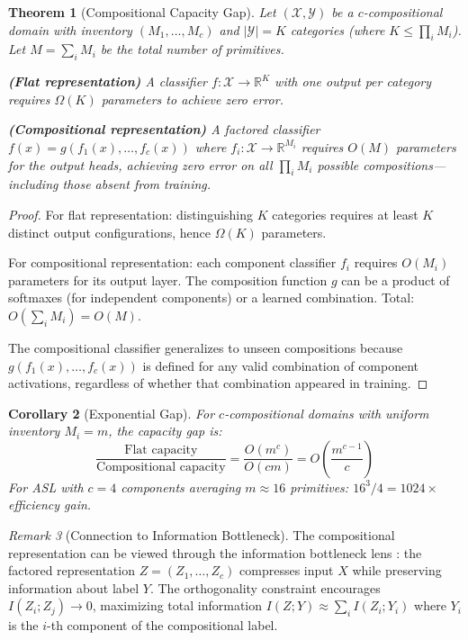 \documentclass{article}
\newtheorem{theorem}{Theorem}[section]
\newtheorem{corollary}[theorem]{Corollary}
\theoremstyle{definition}
\theoremstyle{remark}
\newtheorem{remark}[theorem]{Remark}
\begin{document}
\begin{theorem}[Compositional Capacity Gap]
\label{thm:capacity_gap}
Let $(\mathcal{X}, \mathcal{Y})$ be a $c$-compositional domain with inventory $(M_1, \ldots, M_c)$ and $|\mathcal{Y}| = K$ categories (where $K \leq \prod_i M_i$). Let $M = \sum_i M_i$ be the total number of primitives.

\textbf{(Flat representation)} A classifier $f: \mathcal{X} \to \mathbb{R}^{K}$ with one output per category requires $\Omega(K)$ parameters to achieve zero error.

\textbf{(Compositional representation)} A factored classifier $f(x) = g(f_1(x), \ldots, f_c(x))$ where $f_i: \mathcal{X} \to \mathbb{R}^{M_i}$ requires $O(M)$ parameters for the output heads, achieving zero error on all $\prod_i M_i$ possible compositions---including those absent from training.
\end{theorem}

\begin{proof}
For flat representation: distinguishing $K$ categories requires at least $K$ distinct output configurations, hence $\Omega(K)$ parameters.

For compositional representation: each component classifier $f_i$ requires $O(M_i)$ parameters for its output layer. The composition function $g$ can be a product of softmaxes (for independent components) or a learned combination. Total: $O(\sum_i M_i) = O(M)$.

The compositional classifier generalizes to unseen compositions because $g(f_1(x), \ldots, f_c(x))$ is defined for any valid combination of component activations, regardless of whether that combination appeared in training.
\end{proof}

\begin{corollary}[Exponential Gap]
For $c$-compositional domains with uniform inventory $M_i = m$, the capacity gap is:
\begin{equation}
\frac{\text{Flat capacity}}{\text{Compositional capacity}} = \frac{O(m^c)}{O(cm)} = O\left(\frac{m^{c-1}}{c}\right)
\end{equation}
For ASL with $c=4$ components averaging $m \approx 16$ primitives: $16^3/4 = 1024\times$ efficiency gain.
\end{corollary}

\begin{remark}[Connection to Information Bottleneck]
The compositional representation can be viewed through the information bottleneck lens \citep{tishby2000information}: the factored representation $Z = (Z_1, \ldots, Z_c)$ compresses input $X$ while preserving information about label $Y$. The orthogonality constraint encourages $I(Z_i; Z_j) \to 0$, maximizing total information $I(Z; Y) \approx \sum_i I(Z_i; Y_i)$ where $Y_i$ is the $i$-th component of the compositional label.
\end{remark}
\end{document}
